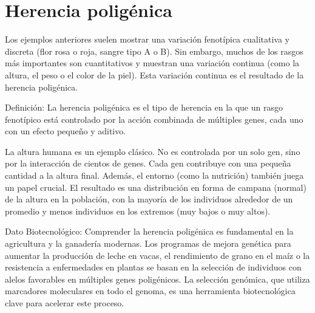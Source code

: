 \section{Herencia poligénica}

Los ejemplos anteriores suelen mostrar una variación fenotípica cualitativa y discreta (flor rosa o roja, sangre tipo A o B). Sin embargo, muchos de los rasgos más importantes son cuantitativos y muestran una variación continua (como la altura, el peso o el color de la piel). Esta variación continua es el resultado de la herencia poligénica.

Definición: La herencia poligénica es el tipo de herencia en la que un rasgo fenotípico está controlado por la acción combinada de múltiples genes, cada uno con un efecto pequeño y aditivo.

La altura humana es un ejemplo clásico. No es controlada por un solo gen, sino por la interacción de cientos de genes. Cada gen contribuye con una pequeña cantidad a la altura final. Además, el entorno (como la nutrición) también juega un papel crucial. El resultado es una distribución en forma de campana (normal) de la altura en la población, con la mayoría de los individuos alrededor de un promedio y menos individuos en los extremos (muy bajos o muy altos).

Dato Biotecnológico: Comprender la herencia poligénica es fundamental en la agricultura y la ganadería modernas. Los programas de mejora genética para aumentar la producción de leche en vacas, el rendimiento de grano en el maíz o la resistencia a enfermedades en plantas se basan en la selección de individuos con alelos favorables en múltiples genes poligénicos. La selección genómica, que utiliza marcadores moleculares en todo el genoma, es una herramienta biotecnológica clave para acelerar este proceso.